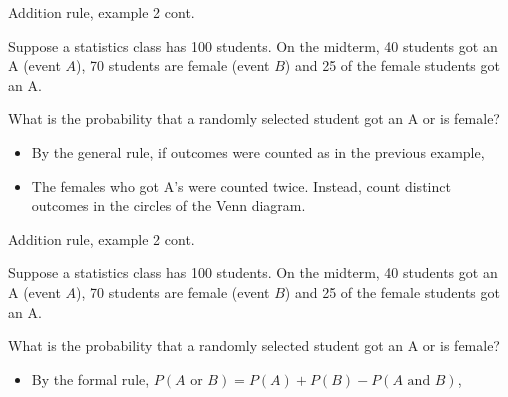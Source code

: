 \documentclass[xcolor=table, aspectratio=169, bigger]{beamer}
\begin{document}
\begin{frame}{Addition rule, example 2 cont.}
\begin{block}{}
Suppose a statistics class has 100 students. On the midterm, 40 students got an A (event $A$),  70 students are female (event $B$) and 25 of the female students got an A.
\end{block}
\begin{exampleblock}{}
What is the probability that a randomly selected student got an A or is female?
\begin{itemize}
\pause
\item By the general rule, if outcomes were counted as in the previous example,\\
\smallskip{}

\pause
\item The females who got A's were counted twice. Instead, count distinct outcomes in the circles of the Venn diagram.\\
\smallskip{}

\end{itemize}
\end{exampleblock}

\end{frame}

\begin{frame}{Addition rule, example 2 cont.}
\begin{block}{}
Suppose a statistics class has 100 students. On the midterm, 40 students got an A (event $A$),  70 students are female (event $B$) and 25 of the female students got an A.
\end{block}

\begin{exampleblock}{}
What is the probability that a randomly selected student got an A or is female?
\begin{itemize}
\pause
\item By the formal rule, $P(A \text{ or } B) = P(A) + P(B) - P(A \text{ and } B)$,\\
\smallskip{}
\smallskip{}
\end{itemize}
\end{exampleblock}
\end{frame}
\end{document}
